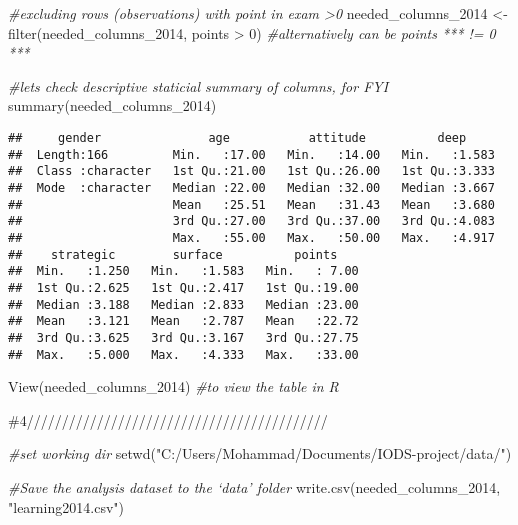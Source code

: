 \documentclass[
]{article}
\newenvironment{Shaded}{\begin{snugshade}}{\end{snugshade}}
\newcommand{\CommentTok}[1]{\textcolor[rgb]{0.56,0.35,0.01}{\textit{#1}}}
\newcommand{\DecValTok}[1]{\textcolor[rgb]{0.00,0.00,0.81}{#1}}
\newcommand{\FunctionTok}[1]{\textcolor[rgb]{0.00,0.00,0.00}{#1}}
\newcommand{\NormalTok}[1]{#1}
\newcommand{\OtherTok}[1]{\textcolor[rgb]{0.56,0.35,0.01}{#1}}
\newcommand{\SpecialCharTok}[1]{\textcolor[rgb]{0.00,0.00,0.00}{#1}}
\newcommand{\StringTok}[1]{\textcolor[rgb]{0.31,0.60,0.02}{#1}}
\begin{document}
\begin{Shaded}
\begin{Highlighting}[]
\CommentTok{\#excluding rows (observations) with point in exam \textgreater{}0}
\NormalTok{needed\_columns\_2014 }\OtherTok{\textless{}{-}} \FunctionTok{filter}\NormalTok{(needed\_columns\_2014, points }\SpecialCharTok{\textgreater{}} \DecValTok{0}\NormalTok{) }\CommentTok{\#alternatively can be points *** != 0 ***}

\CommentTok{\#let\textquotesingle{}s check descriptive staticial summary of columns, for FYI}
\FunctionTok{summary}\NormalTok{(needed\_columns\_2014)}
\end{Highlighting}
\end{Shaded}

\begin{verbatim}
##     gender               age           attitude          deep      
##  Length:166         Min.   :17.00   Min.   :14.00   Min.   :1.583  
##  Class :character   1st Qu.:21.00   1st Qu.:26.00   1st Qu.:3.333  
##  Mode  :character   Median :22.00   Median :32.00   Median :3.667  
##                     Mean   :25.51   Mean   :31.43   Mean   :3.680  
##                     3rd Qu.:27.00   3rd Qu.:37.00   3rd Qu.:4.083  
##                     Max.   :55.00   Max.   :50.00   Max.   :4.917  
##    strategic        surface          points     
##  Min.   :1.250   Min.   :1.583   Min.   : 7.00  
##  1st Qu.:2.625   1st Qu.:2.417   1st Qu.:19.00  
##  Median :3.188   Median :2.833   Median :23.00  
##  Mean   :3.121   Mean   :2.787   Mean   :22.72  
##  3rd Qu.:3.625   3rd Qu.:3.167   3rd Qu.:27.75  
##  Max.   :5.000   Max.   :4.333   Max.   :33.00
\end{verbatim}

\begin{Shaded}
\begin{Highlighting}[]
\FunctionTok{View}\NormalTok{(needed\_columns\_2014) }\CommentTok{\#to view the table in R}
\end{Highlighting}
\end{Shaded}

\#4///////////////////////////////////////////

\begin{Shaded}
\begin{Highlighting}[]
\CommentTok{\#set working dir}
\FunctionTok{setwd}\NormalTok{(}\StringTok{"C:/Users/Mohammad/Documents/IODS{-}project/data/"}\NormalTok{)}

\CommentTok{\#Save the analysis dataset to the ‘data’ folder}
\FunctionTok{write.csv}\NormalTok{(needed\_columns\_2014, }\StringTok{"learning2014.csv"}\NormalTok{) }
\end{Highlighting}
\end{Shaded}
\end{document}
